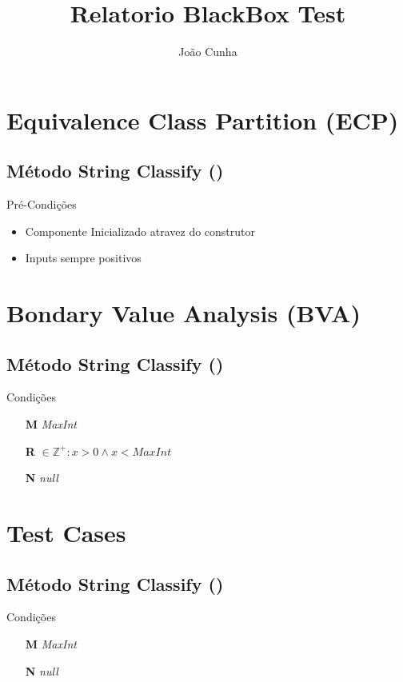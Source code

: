 \documentclass[a4paper]{article}
\title{Relatorio BlackBox Test}
\author{João Cunha}
\begin{document}
\maketitle
\tableofcontents
\clearpage

\section{Equivalence Class Partition (ECP)}
\subsection{\textbf{Método} String Classify () }
Pré-Condições
\begin{itemize}
  \item Componente Inicializado atravez do construtor
  \item Inputs sempre positivos
\end{itemize}


\section{Bondary Value Analysis (BVA)}
\subsection{\textbf{Método} String Classify () }
Condições
\begin{itemize}
  \item [\textbf{M}] \textit{MaxInt}
  \item [\textbf{R}] $\in \mathbb{Z}^+: x > 0 \land x < MaxInt$
  \item [\textbf{N}] \textit{null}
\end{itemize}


\section{Test Cases}
\subsection{\textbf{Método} String Classify () }
Condições
\begin{itemize}
  \item [\textbf{M}] \textit{MaxInt}
  \item [\textbf{N}] \textit{null}
\end{itemize}

\end{document}
